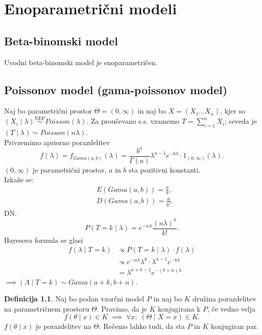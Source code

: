 \documentclass[a4paper, 12pt]{book}
\theoremstyle{definition}
\newtheorem{defn}[counter]{Definicija}
\theoremstyle{remark}
\begin{document}
\chapter{Enoparametrični modeli}


\section{Beta-binomski model}

Uvodni beta-binomski model je enoparametričen.


\section{Poissonov model (gama-poissonov model)}

Naj bo parametrični prostor $\Theta = (0, \infty)$ in naj bo $X = (X_1 \dots X_n)$,
kjer so $(X_i \mid \lambda) \stackrel{\text{NEP}}{\sim} Poisson(\lambda)$.
Za proučevano s.s. vzamemo $T = \sum_{i=1}^{n} X_i$; seveda je $(T \mid \lambda) \sim Poisson(n\lambda)$. \\
Privzemimo apriorno porazdelitev
\begin{equation*}
  f(\lambda) = f_{Gama(a,b)}(\lambda) = \frac{b^a}{\Gamma(a)} \lambda^{a-1} e^{-b\lambda} \cdot 1_{(0,\infty)}(\lambda).
\end{equation*}
$(0,\infty)$ je parametrični prostor, $a$ in $b$ sta pozitivni konstanti. \\
Izkaže se:
\begin{align*}
  &E(Gama(a,b)) = \frac{a}{b}, \\
  &D(Gama(a,b)) = \frac{a}{b^2}.
\end{align*}
DN. \\
\begin{equation*}
  P(T = k \mid \lambda) = e^{-n \lambda} \frac{(n \lambda)^k}{k!}.
\end{equation*}
Bayesova formula se glasi
\begin{align*}
  f(\lambda \mid T = k) &\propto P(T = k \mid \lambda) \cdot f(\lambda) \\
  &\propto e^{-n \lambda} \lambda^k \cdot \lambda^{a-1} e^{-b \lambda} \\
  &= \lambda^{a+k-1} e^{-(b+n) \lambda}
\end{align*}
$\implies (\Lambda \mid T = k) \sim Gama(a+k, b+n)$.

\begin{defn}
  Naj bo podan vzorčni model $P$ in naj bo $K$ družina porazdelitev na parametričnem prostoru $\Theta$.
  Pravimo, da je $K$ konjugirana k $P$, če vedno velja
  \begin{equation*}
    f(\theta \mid x) \in K \; \implies \; \forall x: \; (\Theta \mid X = x) \in K.
  \end{equation*}
  $f(\theta \mid x)$ je porazdelitev na $\Theta$.
  Rečemo lahko tudi, da sta $P$ in $K$ konjugiran par.
\end{defn}
\end{document}
